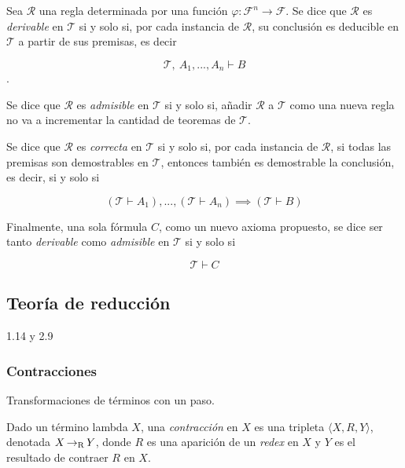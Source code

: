 \begin{defn}
  \label{defn:regla-derivable}
  Sea \( \mathcal{R} \) una regla determinada por una función \( φ \colon \mathcal{F}^{n} \to \mathcal{F} \). Se dice que \( \mathcal{R} \) es \emph{derivable} en \( \mathcal{T} \) si y solo si, por cada instancia de \( \mathcal{R} \), su conclusión es deducible en \( \mathcal{T} \) a partir de sus premisas, es decir

  \[ \mathcal{T},\ A_{1},...,A_{n} \vdash B \].

  Se dice que \( \mathcal{R} \) es \emph{admisible} en \( \mathcal{T} \) si y solo si, añadir \( \mathcal{R} \) a \( \mathcal{T} \) como una nueva regla no va a incrementar la cantidad de teoremas de \( \mathcal{T} \).

  Se dice que \( \mathcal{R} \) es \emph{correcta} en \( \mathcal{T} \) si y solo si, por cada instancia de \( \mathcal{R} \), si todas las premisas son demostrables en \( \mathcal{T} \), entonces también es demostrable la conclusión, es decir, si y solo si

  \[ (\mathcal{T} \vdash A_{1}),...,(\mathcal{T} \vdash A_{n}) \implies (\mathcal{T} \vdash B) \]

  Finalmente, una sola fórmula \( C \), como un nuevo axioma propuesto, se dice ser tanto \emph{derivable} como \emph{admisible} en \( \mathcal{T} \) si y solo si

  \[ \mathcal{T} \vdash C \]
\end{defn}

\subsection{Teoría de reducción}
\label{sec:teoriareduccion}

1.14 y 2.9

\subsubsection{Contracciones}
\label{sec:contracciones}

Transformaciones de términos con un paso.

\begin{defn}
  \label{defn:contraccion}
  Dado un término lambda \( X \), una \emph{contracción} en \( X \) es una tripleta \( \langle X,R,Y \rangle \), denotada \( X \operatorname{\rightarrow_{R}} Y \), donde \( R \) es una aparición de un \emph{redex} en \( X \) y \( Y \) es el resultado de contraer \( R \) en \( X \).
\end{defn}

